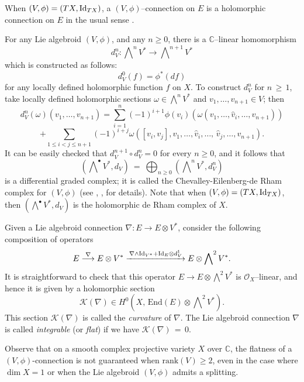 \documentclass[12pt,reqno]{amsart}
\numberwithin{equation}{section}
\theoremstyle{definition}
\begin{document}
When $(V, \phi)  =  (TX, {\rm Id}_{TX})$, a $(V, \phi)$--connection on $E$ is a 
holomorphic connection on $E$ in the usual sense \cite{At}.

For any Lie algebroid $(V, \phi)$, and any $n \geq 0$, there is a $\mathbb C$--linear homomorphism
$$
d^n_V : \bigwedge\nolimits^n V^*  \longrightarrow \bigwedge\nolimits^{n+1} V^*
$$
which is constructed as follows:
\begin{equation}\label{d0}
d_V^0(f)  = \phi^*(df)
\end{equation}
for any locally defined holomorphic function $f$
on $X$. To construct $d^n_V$ for $n\, \geq\, 1$, take locally defined holomorphic sections $\omega  \in
\bigwedge^n V^*$ and $v_1, \ldots, v_{n+1} \in V$; then
\begin{equation}\label{d10}
d^n_V(\omega)(v_1, \ldots, v_{n+1}) = \sum_{i=1}^n (-1)^{i+1}\phi(v_i)(\omega(v_1, \ldots,
\widehat{v}_i, \ldots,  v_{n+1}))
\end{equation}
$$
+\sum_{1\le i<j\le n+1}(-1)^{i+j} \omega\left ([v_i, v_j], v_1, \ldots,
\widehat{v}_i, \ldots,\,\widehat{v}_j, \ldots, v_{n+1}\right).
$$
It can be easily checked that $d^{n+1}_V \circ d^{n}_V = 0$ for every $n \geq 0$, and it follows that 
$$\left (\bigwedge\nolimits^\bullet V^*, d_V \right) \ =\
\bigoplus_{n\geq 0} \left(\bigwedge\nolimits^n V^*, d^n_V\right)$$
is a differential graded complex; it
is called the Chevalley-Eilenberg-de Rham complex for $(V, \phi)$ (see \cite{BMRT}, \cite{LSX},
\cite{BR} for details).
Note that when $(V, \phi)  =  (TX, {\rm Id}_{TX})$, then $(\bigwedge\nolimits^\bullet V^*, d_V)$
is the holomorphic de Rham complex of $X$.

Given a Lie algebroid connection $\nabla  :  E  \longrightarrow  E\otimes V^*$, consider the
following composition of operators
$$
E   \stackrel{\nabla}{\longrightarrow}  E\otimes V^*  \xrightarrow{\,\nabla \wedge {\rm Id}_{V^*}+
{\rm Id}_E\otimes d^1_V }   E\otimes \bigwedge\nolimits^2 V^*.
$$
It is straightforward to check that this operator $E \longrightarrow E\otimes \bigwedge\nolimits^2 V^*$
is ${\mathcal O}_X$--linear, and hence it is given by a holomorphic section
$$
{\mathcal K}(\nabla) \in  H^0(X,\, \text{End}(E)\otimes \bigwedge\nolimits^2 V^*).
$$
This section ${\mathcal K}(\nabla)$ is called the \textit{curvature} of $\nabla$. The 
Lie algebroid connection $\nabla$ is called \textit{integrable} (or \textit{flat}) if
we have ${\mathcal K}(\nabla)\,=\, 0$.

Observe that on a smooth complex projective variety $X$ over $\mathbb{C}$, the flatness of a 
$(V, \phi)$-connection is not guaranteed when $\mathrm{rank}(V) \ge  2$, even in the case where $\dim X  =  1$ 
or when the Lie algebroid $(V, \phi)$ admits a splitting.
\end{document}
